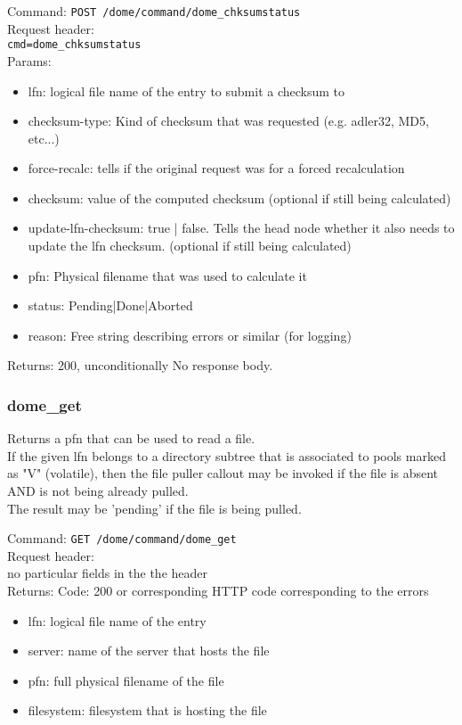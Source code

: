 \documentclass[a4paper,10pt]{scrreprt}
\begin{document}
Command:
\lstinline"POST /dome/command/dome_chksumstatus"\\

Request header:\\
\lstinline"cmd=dome_chksumstatus"\\

Params:
\begin{itemize}
 \item lfn: logical file name of the entry to submit a checksum to
 \item checksum-type: Kind of checksum that was requested (e.g. adler32, MD5, etc...)
 \item force-recalc: tells if the original request was for a forced recalculation
 \item checksum: value of the computed checksum (optional if still being calculated)
 \item update-lfn-checksum: true | false. Tells the head node whether it also needs to update the lfn checksum. (optional if still being calculated)
 \item pfn: Physical filename that was used to calculate it
 \item status: Pending|Done|Aborted
 \item reason: Free string describing errors or similar (for logging)
\end{itemize}

Returns: 200, unconditionally
No response body.



\subsubsection{dome\_get}
Returns a pfn that can be used to read a file.\\

If the given lfn belongs to a directory subtree that is associated to pools marked as "V" (volatile), then the file puller callout
may be invoked if the file is absent AND is not being already pulled.\\
The result may be 'pending' if the file is being pulled.

Command:
\lstinline"GET /dome/command/dome_get"\\

Request header:\\
no particular fields in the the header\\

Returns:
Code: 200 or corresponding HTTP code corresponding to the errors
\begin{itemize}
 \item lfn: logical file name of the entry
 \item server: name of the server that hosts the file
 \item pfn: full physical filename of the file
 \item filesystem: filesystem that is hosting the file
\end{itemize}
\end{document}
